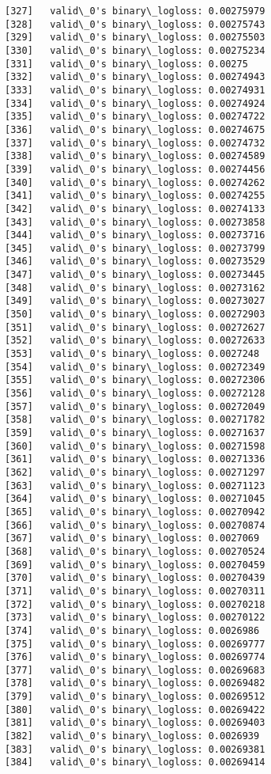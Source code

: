 \documentclass[11pt]{article}
\begin{document}
\begin{Verbatim}[commandchars=\\\{\}]
[327]	valid\_0's binary\_logloss: 0.00275979
[328]	valid\_0's binary\_logloss: 0.00275743
[329]	valid\_0's binary\_logloss: 0.00275503
[330]	valid\_0's binary\_logloss: 0.00275234
[331]	valid\_0's binary\_logloss: 0.00275
[332]	valid\_0's binary\_logloss: 0.00274943
[333]	valid\_0's binary\_logloss: 0.00274931
[334]	valid\_0's binary\_logloss: 0.00274924
[335]	valid\_0's binary\_logloss: 0.00274722
[336]	valid\_0's binary\_logloss: 0.00274675
[337]	valid\_0's binary\_logloss: 0.00274732
[338]	valid\_0's binary\_logloss: 0.00274589
[339]	valid\_0's binary\_logloss: 0.00274456
[340]	valid\_0's binary\_logloss: 0.00274262
[341]	valid\_0's binary\_logloss: 0.00274255
[342]	valid\_0's binary\_logloss: 0.00274133
[343]	valid\_0's binary\_logloss: 0.00273858
[344]	valid\_0's binary\_logloss: 0.00273716
[345]	valid\_0's binary\_logloss: 0.00273799
[346]	valid\_0's binary\_logloss: 0.00273529
[347]	valid\_0's binary\_logloss: 0.00273445
[348]	valid\_0's binary\_logloss: 0.00273162
[349]	valid\_0's binary\_logloss: 0.00273027
[350]	valid\_0's binary\_logloss: 0.00272903
[351]	valid\_0's binary\_logloss: 0.00272627
[352]	valid\_0's binary\_logloss: 0.00272633
[353]	valid\_0's binary\_logloss: 0.0027248
[354]	valid\_0's binary\_logloss: 0.00272349
[355]	valid\_0's binary\_logloss: 0.00272306
[356]	valid\_0's binary\_logloss: 0.00272128
[357]	valid\_0's binary\_logloss: 0.00272049
[358]	valid\_0's binary\_logloss: 0.00271782
[359]	valid\_0's binary\_logloss: 0.00271637
[360]	valid\_0's binary\_logloss: 0.00271598
[361]	valid\_0's binary\_logloss: 0.00271336
[362]	valid\_0's binary\_logloss: 0.00271297
[363]	valid\_0's binary\_logloss: 0.00271123
[364]	valid\_0's binary\_logloss: 0.00271045
[365]	valid\_0's binary\_logloss: 0.00270942
[366]	valid\_0's binary\_logloss: 0.00270874
[367]	valid\_0's binary\_logloss: 0.0027069
[368]	valid\_0's binary\_logloss: 0.00270524
[369]	valid\_0's binary\_logloss: 0.00270459
[370]	valid\_0's binary\_logloss: 0.00270439
[371]	valid\_0's binary\_logloss: 0.00270311
[372]	valid\_0's binary\_logloss: 0.00270218
[373]	valid\_0's binary\_logloss: 0.00270122
[374]	valid\_0's binary\_logloss: 0.0026986
[375]	valid\_0's binary\_logloss: 0.00269777
[376]	valid\_0's binary\_logloss: 0.00269774
[377]	valid\_0's binary\_logloss: 0.00269683
[378]	valid\_0's binary\_logloss: 0.00269482
[379]	valid\_0's binary\_logloss: 0.00269512
[380]	valid\_0's binary\_logloss: 0.00269422
[381]	valid\_0's binary\_logloss: 0.00269403
[382]	valid\_0's binary\_logloss: 0.0026939
[383]	valid\_0's binary\_logloss: 0.00269381
[384]	valid\_0's binary\_logloss: 0.00269414

\end{Verbatim}
\end{document}
